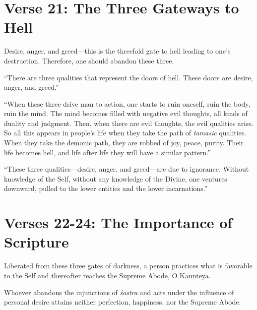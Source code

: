 \section{Verse 21: The Three Gateways to Hell}\label{sec-verse-21-the-three-gateways-to-hell}

{Desire, anger, and greed---this is the threefold gate to hell leading to one's destruction. Therefore, one should abandon these three.}

\enquote{There are three qualities that represent the doors of hell. These doors are desire, anger, and greed.}

\enquote{When these three drive man to action, one starts to ruin oneself, ruin the body, ruin the mind. The mind becomes filled with negative evil thoughts, all kinds of duality and judgment. Then, when there are evil thoughts, the evil qualities arise. So all this appears in people’s life when they take the path of \textit{tamasic} qualities. When they take the demonic path, they are robbed of joy, peace, purity. Their life becomes hell, and life after life they will have a similar pattern.}

\enquote{These three qualities---desire, anger, and greed---are due to ignorance. Without knowledge of the Self, without any knowledge of the Divine, one ventures downward, pulled to the lower entities and the lower incarnations.}

\section{Verses 22-24: The Importance of Scripture}\label{sec-verses-22-24-the-importance-of-scripture}

{Liberated from these three gates of darkness, a person practices what is favorable to the Self and thereafter reaches the Supreme Abode, O Kaunteya.}

{Whoever abandons the injunctions of \textit{śāstra} and acts under the influence of personal desire attains neither perfection, happiness, nor the Supreme Abode.}

